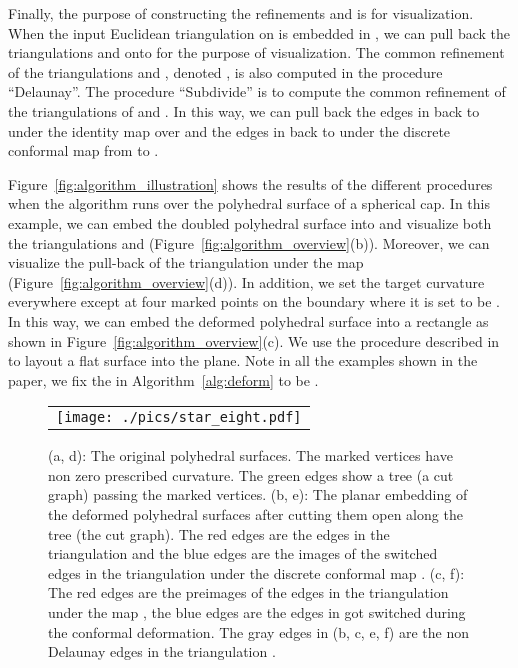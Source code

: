\documentclass[11pt]{article}
\begin{document}
Finally, the purpose of constructing the refinements  and  
is for visualization. When the input Euclidean triangulation  on  is embedded 
in , we can pull back the triangulations  and  onto  for the purpose 
of visualization.  The common refinement of the triangulations  and , denoted ,
is also computed in the procedure ``Delaunay''. The procedure ``Subdivide'' is to
compute the common refinement of the triangulations of  and . In this way, we can
pull back the edges in  back to  under the identity map over  and the edges in
 back to  under the discrete conformal map  from  to . 



Figure~\ref{fig:algorithm_illustration} shows the results of the different procedures 
when the algorithm runs over the polyhedral surface of a spherical cap.  
In this example, we can embed the doubled polyhedral surface into 
and visualize both the triangulations  and  (Figure~\ref{fig:algorithm_overview}(b)). 
Moreover, we can visualize the 
pull-back of the triangulation  under the map  (Figure~\ref{fig:algorithm_overview}(d)). 
In addition, we set the target curvature  everywhere except at four marked points on the boundary 
where it is set to be . In this way, we can embed the deformed polyhedral surface 
into a rectangle as shown in Figure~\ref{fig:algorithm_overview}(c). We use the procedure described 
in~\cite{gu:2008} to layout a flat surface into the plane. 
Note in all the examples shown in the paper, we fix the  in Algorithm~\ref{alg:deform} to be . 

\begin{figure}[!ht]
\begin{center}
\begin{tabular}{c}
\texttt{[image: ./pics/star\_eight.pdf]}
\end{tabular}
\end{center}
\vspace{0.1in}
\caption{(a, d): The original polyhedral surfaces. The marked vertices
have non zero prescribed curvature. The green edges show a tree (a cut graph)
passing the marked vertices.
(b, e): The planar embedding of the deformed polyhedral surfaces after cutting
them open along the tree (the cut graph). 
The red edges are the edges in the triangulation  and the blue edges are the images of
the switched edges in the triangulation  under the discrete conformal map . 
(c, f): The red edges are the preimages of the edges in the triangulation  under the map , 
the blue edges are the edges in  got switched during the conformal deformation.
The gray edges in (b, c, e, f) are the non Delaunay edges in the 
triangulation .
\label{fig:simple_examples}}
\end{figure}
\end{document}
